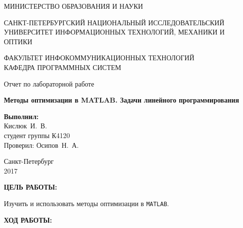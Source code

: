 \documentclass[14pt,a4paper]{extreport}
\newcommand{\header}[1]{%
{
\clearpage%
\fontsize{16pt}{14pt}\selectfont
\begin{center}
\textbf{\MakeUppercase{#1}:}
\end{center}
}
}
\newcommand{\matlab}{\texttt{\MakeUppercase{matlab}}}
\newcommand{\labyear}{2017}
\newcommand{\labtitle}{Методы оптимизации в \MakeUppercase{Matlab}. Задачи линейного программирования}
\newcommand{\prepod}{Осипов~Н.~А.}
\newcommand{\student}{Кислюк~И.~В.}
\begin{document}
	\begin{titlepage}
	\begin{center}	
		\fontsize{14pt}{14pt}\selectfont
		МИНИСТЕРСТВО ОБРАЗОВАНИЯ И НАУКИ\\

		\vspace*{0.6\baselineskip}

		\MakeUppercase{Санкт-Петербургский Национальный Исследовательский Университет Информационных технологий, механики и оптики}		
		
		\vspace*{0.6\baselineskip}
		\MakeUppercase{Факультет Инфокоммуникационных технологий}\\
		\MakeUppercase{Кафедра программных систем}
	
		\vspace*{7\baselineskip}
		\fontsize{19pt}{18pt}\selectfont
		Отчет по лабораторной работе
		
		\fontsize{20pt}{18pt}\selectfont
		\textbf{\labtitle}\\
		\vspace*{1.15\baselineskip}
		\end{center}
	
	\vspace*{2\baselineskip}
	\begin{flushright}
	\fontsize{14pt}{14pt}\selectfont
	\textbf{Выполнил:}\\
	\student\\
	студент группы К4120\\
	Проверил: \prepod\\
	\end{flushright}
	
	\vspace{\fill}
	\begin{center}
	Санкт-Петербург\\
	\vspace{-1ex}
	\labyear
	\end{center}
	
\end{titlepage}

\fontsize{14pt}{14pt}\selectfont

\header{Цель работы}

Изучить и использовать методы оптимизации в \matlab.

\header{Ход работы}
\end{document}

